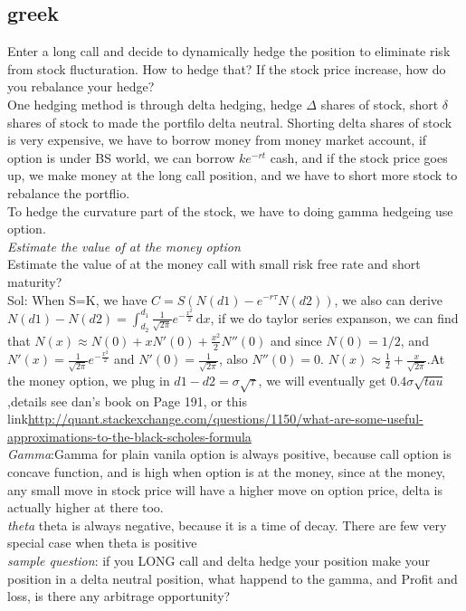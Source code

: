 \documentclass[a4paper,11pt]{article}
\begin{document}
\subsection{greek}
Enter a long call and decide to dynamically hedge the position to eliminate risk from stock flucturation. How to hedge that? If the stock price increase, how do you rebalance your hedge?\\
One hedging method is through delta hedging, hedge $\Delta$ shares of stock, short $\delta$ shares of stock to made the portfilo delta neutral. Shorting delta shares of stock is very expensive, we have to borrow money from money market account, if option is under BS world, we can borrow $ke^{-rt}$ cash, and if the stock price goes up, we make money at the long call position, and we have to short more stock to rebalance the portflio. \\
To hedge the curvature part of the stock, we have to doing gamma hedgeing use option.\\
{\em Estimate the value of at the money option}\\
Estimate the value of at the money call with small risk free rate and short maturity?\\
Sol: When S=K, we have $C=S(N(d1)-e^{-r\tau}N(d2))$, we also can derive $N(d1)-N(d2)=\int_{d_2}^{d_1} \! \frac{1}{\sqrt{2\pi}} e^{-\frac{x^{2}}{2}}\, \mathrm{d}x$, if we do taylor series expanson, we can find that $N(x)\approx  N(0)+xN'(0)+\frac{x^2}{2}N''(0)$ and since $N(0)=1/2$, and $N'(x)=\frac{1}{\sqrt{2\pi}}e^{-\frac{x^2}{2}}$ and $N'(0)=\frac{1}{\sqrt{2\pi}}$, also $N''(0)=0$. $N(x)\approx \frac{1}{2}+\frac{x}{\sqrt{2\pi}}$.At the money option, we plug in $d1-d2=\sigma\sqrt{\tau}$, we will eventually get $0.4\sigma\sqrt{tau}$,details see dan's book on Page 191, or this link\url{http://quant.stackexchange.com/questions/1150/what-are-some-useful-approximations-to-the-black-scholes-formula}\\
{\em Gamma}:Gamma for plain vanila option is always positive, because call option is concave function, and is high when option is at the money, since at the money, any small move in stock price will have a higher move on option price, delta is actually higher at there too. \\
{\em theta} theta is always negative, because it is a time of decay. There are few very special case when theta is positive\\
{\em sample question}: if you LONG call and delta hedge your position make your position in a delta neutral position, what happend to the gamma, and Profit and loss, is there any arbitrage opportunity?\\
\end{document}
